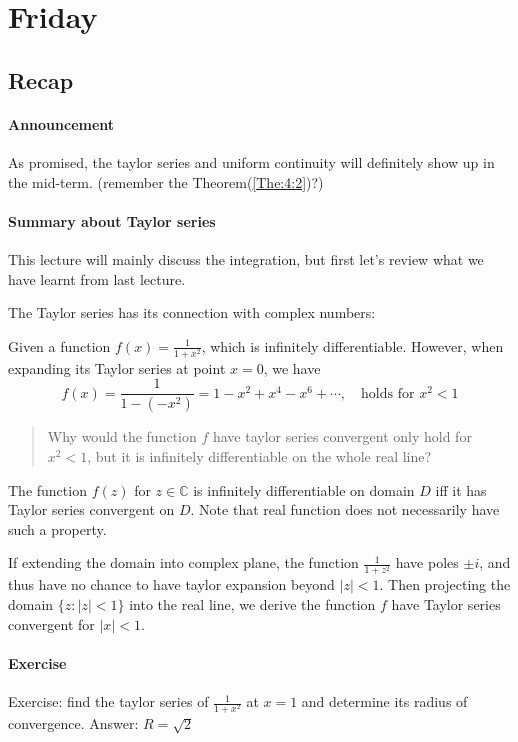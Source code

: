 
\section{Friday}
\subsection{Recap}
\paragraph{Announcement}
As promised, the taylor series and uniform continuity will definitely show up in the mid-term. (remember the Theorem(\ref{The:4:2})?)
\paragraph{Summary about Taylor series}
This lecture will mainly discuss the integration, but first let's review what we have learnt from last lecture.

The Taylor series has its connection with complex numbers:
\begin{example}
Given a function $f(x)=\frac{1}{1+x^2}$, which is infinitely differentiable. However, when expanding its Taylor series at point $x=0$, we have
\[
f(x)=\frac{1}{1-(-x^2)}=1-x^2+x^4-x^6+\cdots,\quad\mbox{holds for $x^2<1$}
\]
\begin{quotation}
Why would the function $f$ have taylor series convergent only hold for $x^2<1$, but it is infinitely differentiable on the whole real line? 
\end{quotation}
\begin{proposition}
The function $f(z)$ for $z\in\mathbb{C}$ is infinitely differentiable on domain $D$ iff it has Taylor series convergent on $D$. Note that real function does not necessarily have such a property.
\end{proposition}

If extending the domain into complex plane, the function $\frac{1}{1+z^2}$ have poles $\pm i$, and thus have no chance to have taylor expansion beyond $|z|<1$. Then
 projecting the domain $\{z:|z|<1\}$ into the real line, we derive the function $f$ have Taylor series convergent for $|x|<1$.
\end{example}
\paragraph{Exercise}
Exercise: find the taylor series of $\frac{1}{1+x^2}$ at $x=1$ and determine its radius of convergence. Answer: $R=\sqrt{2}$
